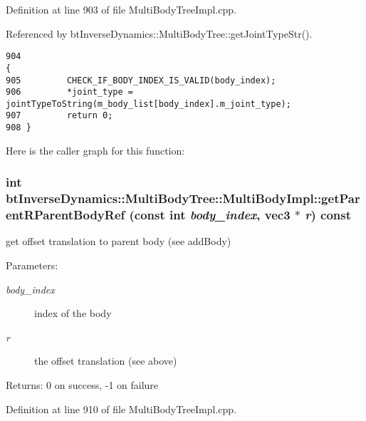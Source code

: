 Definition at line 903 of file MultiBodyTreeImpl.cpp.

Referenced by btInverseDynamics::MultiBodyTree::getJointTypeStr().

\begin{Code}\begin{verbatim}904                                                                                                                                  {
905         CHECK_IF_BODY_INDEX_IS_VALID(body_index);
906         *joint_type = jointTypeToString(m_body_list[body_index].m_joint_type);
907         return 0;
908 }
\end{verbatim}
\end{Code}




Here is the caller graph for this function:\hypertarget{classbt_inverse_dynamics_1_1_multi_body_tree_1_1_multi_body_impl_92f65125b9ebf8c347e4f52df440f69b}{
\subsubsection[getParentRParentBodyRef]{\setlength{\rightskip}{0pt plus 5cm}int btInverseDynamics::MultiBodyTree::MultiBodyImpl::getParentRParentBodyRef (const int {\em body\_\-index}, \/  {\bf vec3} $\ast$ {\em r}) const}}
\label{classbt_inverse_dynamics_1_1_multi_body_tree_1_1_multi_body_impl_92f65125b9ebf8c347e4f52df440f69b}


get offset translation to parent body (see addBody) \begin{Desc}
\item[Parameters:]
\begin{description}
\item[{\em body\_\-index}]index of the body \item[{\em r}]the offset translation (see above) \end{description}
\end{Desc}
\begin{Desc}
\item[Returns:]0 on success, -1 on failure \end{Desc}
 

Definition at line 910 of file MultiBodyTreeImpl.cpp.

